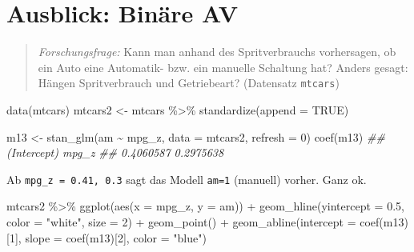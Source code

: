 \documentclass[
  a4paper,
  DIV=11]{scrreprt}
\newenvironment{Shaded}{\begin{snugshade}}{\end{snugshade}}
\newcommand{\AttributeTok}[1]{\textcolor[rgb]{0.40,0.45,0.13}{#1}}
\newcommand{\ConstantTok}[1]{\textcolor[rgb]{0.56,0.35,0.01}{#1}}
\newcommand{\DecValTok}[1]{\textcolor[rgb]{0.68,0.00,0.00}{#1}}
\newcommand{\DocumentationTok}[1]{\textcolor[rgb]{0.37,0.37,0.37}{\textit{#1}}}
\newcommand{\FloatTok}[1]{\textcolor[rgb]{0.68,0.00,0.00}{#1}}
\newcommand{\FunctionTok}[1]{\textcolor[rgb]{0.28,0.35,0.67}{#1}}
\newcommand{\NormalTok}[1]{\textcolor[rgb]{0.00,0.23,0.31}{#1}}
\newcommand{\OtherTok}[1]{\textcolor[rgb]{0.00,0.23,0.31}{#1}}
\newcommand{\SpecialCharTok}[1]{\textcolor[rgb]{0.37,0.37,0.37}{#1}}
\newcommand{\StringTok}[1]{\textcolor[rgb]{0.13,0.47,0.30}{#1}}
\theoremstyle{definition}
\theoremstyle{remark}
\begin{document}
\hypertarget{ausblick-binuxe4re-av}{%
\section{Ausblick: Binäre AV}\label{ausblick-binuxe4re-av}}

\begin{quote}
\emph{Forschungsfrage:} Kann man anhand des Spritverbrauchs vorhersagen,
ob ein Auto eine Automatik- bzw. ein manuelle Schaltung hat? Anders
gesagt: Hängen Spritverbrauch und Getriebeart? (Datensatz
\texttt{mtcars})
\end{quote}

\begin{Shaded}
\begin{Highlighting}[]
\FunctionTok{data}\NormalTok{(mtcars)}
\NormalTok{mtcars2 }\OtherTok{\textless{}{-}}
\NormalTok{  mtcars }\SpecialCharTok{\%\textgreater{}\%} 
  \FunctionTok{standardize}\NormalTok{(}\AttributeTok{append =} \ConstantTok{TRUE}\NormalTok{)}
\end{Highlighting}
\end{Shaded}

\begin{Shaded}
\begin{Highlighting}[]
\NormalTok{m13 }\OtherTok{\textless{}{-}}
  \FunctionTok{stan\_glm}\NormalTok{(am }\SpecialCharTok{\textasciitilde{}}\NormalTok{ mpg\_z, }
           \AttributeTok{data =}\NormalTok{ mtcars2, }
           \AttributeTok{refresh =} \DecValTok{0}\NormalTok{)}
\FunctionTok{coef}\NormalTok{(m13)}
\DocumentationTok{\#\# (Intercept)       mpg\_z }
\DocumentationTok{\#\#   0.4060587   0.2975638}
\end{Highlighting}
\end{Shaded}

Ab \texttt{mpg\_z\ =\ 0.41,\ 0.3} sagt das Modell \texttt{am=1}
(manuell) vorher. Ganz ok.

\begin{Shaded}
\begin{Highlighting}[]
\NormalTok{mtcars2 }\SpecialCharTok{\%\textgreater{}\%} 
  \FunctionTok{ggplot}\NormalTok{(}\FunctionTok{aes}\NormalTok{(}\AttributeTok{x =}\NormalTok{ mpg\_z, }\AttributeTok{y =}\NormalTok{ am)) }\SpecialCharTok{+}
  \FunctionTok{geom\_hline}\NormalTok{(}\AttributeTok{yintercept =} \FloatTok{0.5}\NormalTok{, }\AttributeTok{color =} \StringTok{"white"}\NormalTok{, }\AttributeTok{size =} \DecValTok{2}\NormalTok{) }\SpecialCharTok{+}
  \FunctionTok{geom\_point}\NormalTok{() }\SpecialCharTok{+}
  \FunctionTok{geom\_abline}\NormalTok{(}\AttributeTok{intercept =} \FunctionTok{coef}\NormalTok{(m13)[}\DecValTok{1}\NormalTok{],}
              \AttributeTok{slope =} \FunctionTok{coef}\NormalTok{(m13)[}\DecValTok{2}\NormalTok{],}
              \AttributeTok{color =} \StringTok{"blue"}\NormalTok{) }
\end{Highlighting}
\end{Shaded}
\end{document}
